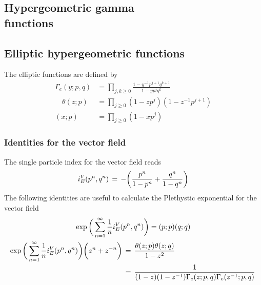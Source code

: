 \begin{appendices}
\chapter{Hypergeometric gamma \\ functions}
\label{appendix:gamma_functions}
\section{Elliptic hypergeometric functions}
The elliptic functions are defined by
\begin{equation} 
	\begin{aligned}
	   \Gamma_e (y;p,q) &= \prod_{j,k \geq 0} \frac{ 1 - y^{-1} p^{j+1} q^{k+1}}{ 1 - y p^j q^k}\\
	  \quad \theta(z;p) &= \prod_{j \geq 0 } (1- z p^j) ( 1- z^{-1}p^{j+1}) \\
	  (x;p) &= \prod_{j \geq 0} ( 1- xp^j)
  	\end{aligned}
\label{eqn:ellptic_hyper_definitions}
\end{equation}

\subsection{Identities for the vector field}
The single particle index for the vector field reads
\begin{equation}
   i_E^V(p^n,q^n) \, = \, - \bigg( {p^n \over 1-p^n} + {q^n \over 1-q^n} \bigg)
\end{equation}
The following identities are useful to calculate the Plethystic exponential for the vector field
\begin{gather}
  \exp \bigg( \sum_{n=1}^{\infty} {1 \over n} i_E^{V} (p^n,q^n) \bigg)  = (p;p) (q;q) 
 \label{eqn:elliptic_index_vector_zero_modes_identity}
 \\
\begin{aligned}
\exp \bigg( \sum_{n=1}^{\infty} {1 \over n} i_E^{V} (p^n,q^n) \bigg) \bigg( z^n + z^{-n} \bigg) \,& =
\,  \frac{ \theta ( z;p) \theta (z;q) }{ 1-z^2 } \\
& =  \, \frac{1}{ ( 1 - z ) ( 1 - z^{-1}) \Gamma_e( z;p,q) \Gamma_e( z^{-1}; p,q)} \,
\label{eqn:elliptic_index_vector_adjoint}
\end{aligned}
\end{gather}



























\end{appendices}
